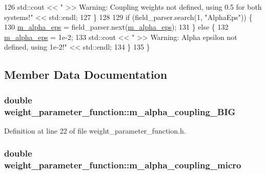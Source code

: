 \begin{DoxyCode}
126             std::cout << \textcolor{stringliteral}{" >> Warning: Coupling weights not defined, using 0.5 for both systems!"} << 
      std::endl;
127         \}
128 
129         \textcolor{keywordflow}{if} (field\_parser.search(1, \textcolor{stringliteral}{"AlphaEps"})) \{
130             \hyperlink{classweight__parameter__function_a6ad313072643dbac787120791eeeac26}{m\_alpha\_eps} = field\_parser.next(\hyperlink{classweight__parameter__function_a6ad313072643dbac787120791eeeac26}{m\_alpha\_eps});
131         \} \textcolor{keywordflow}{else} \{
132             \hyperlink{classweight__parameter__function_a6ad313072643dbac787120791eeeac26}{m\_alpha\_eps} = 1e-2;
133             std::cout << \textcolor{stringliteral}{" >> Warning: Alpha epsilon not defined, using 1e-2!"} << std::endl;
134         \}
135     \}
\end{DoxyCode}


\subsection{Member Data Documentation}
\hypertarget{classweight__parameter__function_a47850e20883c96b524fc322ea5cbc82e}{}
\subsubsection[{m\+\_\+alpha\+\_\+coupling\+\_\+\+B\+I\+G}]{\setlength{\rightskip}{0pt plus 5cm}double weight\+\_\+parameter\+\_\+function\+::m\+\_\+alpha\+\_\+coupling\+\_\+\+B\+I\+G\hspace{0.3cm}{\ttfamily [protected]}}\label{classweight__parameter__function_a47850e20883c96b524fc322ea5cbc82e}


Definition at line 22 of file weight\+\_\+parameter\+\_\+function.\+h.

\hypertarget{classweight__parameter__function_a2136698edf313c3d9250027b07cfeb52}{}
\subsubsection[{m\+\_\+alpha\+\_\+coupling\+\_\+micro}]{\setlength{\rightskip}{0pt plus 5cm}double weight\+\_\+parameter\+\_\+function\+::m\+\_\+alpha\+\_\+coupling\+\_\+micro\hspace{0.3cm}{\ttfamily [protected]}}\label{classweight__parameter__function_a2136698edf313c3d9250027b07cfeb52}


